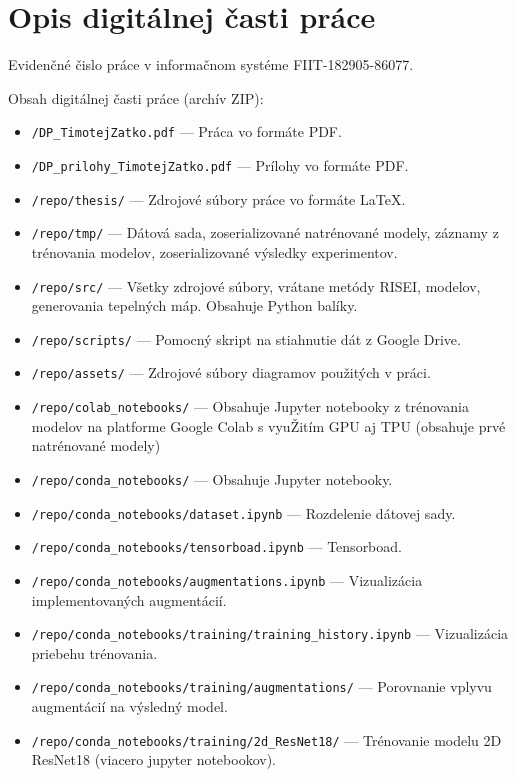 \chapter{Opis digitálnej časti práce \label{cha:cdrom}}

\setcounter{page}{1}

Evidenčné čislo práce v informačnom systéme FIIT-182905-86077.

Obsah digitálnej časti práce (archív ZIP):

\begin{itemize}
    \item \texttt{/DP\_TimotejZatko.pdf} --- Práca vo formáte PDF.
    \item \texttt{/DP\_prilohy\_TimotejZatko.pdf} --- Prílohy vo formáte PDF.
    \item \texttt{/repo/thesis/} --- Zdrojové súbory práce vo formáte \LaTeX.
    \item \texttt{/repo/tmp/} --- Dátová sada, zoserializované natrénované modely, záznamy z trénovania modelov, zoserializované výsledky experimentov. 
    \item \texttt{/repo/src/} --- Všetky zdrojové súbory, vrátane metódy RISEI, modelov, generovania tepelných máp. Obsahuje Python balíky.
    \item \texttt{/repo/scripts/} --- Pomocný skript na stiahnutie dát z Google Drive.
    \item \texttt{/repo/assets/} --- Zdrojové súbory diagramov použitých v práci. 
    \item \texttt{/repo/colab\_notebooks/} --- Obsahuje Jupyter notebooky z trénovania modelov na platforme Google Colab s vyuŽitím GPU aj TPU (obsahuje prvé natrénované modely) 
    \item \texttt{/repo/conda\_notebooks/} --- Obsahuje Jupyter notebooky.
    \item \texttt{/repo/conda\_notebooks/dataset.ipynb} --- Rozdelenie dátovej sady.
    \item \texttt{/repo/conda\_notebooks/tensorboad.ipynb} --- Tensorboad.
    \item \texttt{/repo/conda\_notebooks/augmentations.ipynb} --- Vizualizácia implementovaných augmentácií.
    \item \texttt{/repo/conda\_notebooks/training/training\_history.ipynb} --- Vizualizácia priebehu trénovania.
    \item \texttt{/repo/conda\_notebooks/training/augmentations/} --- Porovnanie vplyvu augmentácií na výsledný model. 
    \item \texttt{/repo/conda\_notebooks/training/2d\_ResNet18/} --- Trénovanie modelu 2D ResNet18 (viacero jupyter notebookov).

\end{itemize}
